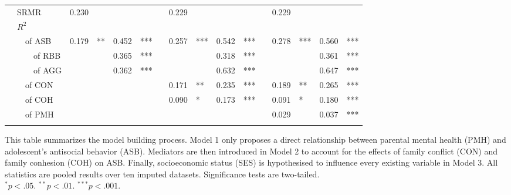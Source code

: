 {\begin{tabular}{llll r@{\hskip -0.1mm}l r@{\hskip -0.1mm}l c r@{\hskip -0.1mm}l r@{\hskip -0.1mm}l c r@{\hskip -0.1mm}l r@{\hskip -0.1mm}l}
            & \multicolumn{3}{l}{SRMR} & 0.230 &       &       &       &       & 0.229 &       &       &       &       & 0.229 &       &       &  \\
            & \multicolumn{3}{l}{$R^2$} &       &       &       &       &       &       &       &       &       &       &       &       &       &  \\
            &       & \multicolumn{2}{l}{of ASB} & 0.179 & ** & 0.452 & *** &       & 0.257 & *** & 0.542 &*** &       & 0.278 & *** & 0.560 & *** \\
            &       &       & of RBB &       &       & 0.365 & *** &       &       &       & 0.318 & *** &       &       &       & 0.361 & *** \\
            &       &       & of AGG &       &       & 0.362 & *** &       &       &       & 0.632 & *** &       &       &       & 0.647 & *** \\
            &       & \multicolumn{2}{l}{of CON} &       &       &       &       &       & 0.171 & ** & 0.235 & *** &       & 0.189 & ** & 0.265 & *** \\
            &       & \multicolumn{2}{l}{of COH} &       &       &       &       &       & 0.090 & * & 0.173 & *** &       & 0.091 & * & 0.180 & *** \\
            &       & \multicolumn{2}{l}{of PMH} &       &       &       &       &       &       &       &       &       &       & 0.029 &       & 0.037 & *** \\
            & & \multicolumn{2}{l}{\phantom{of parental mental health (PHM)}} & \phantom{$-$10,110.014} & \phantom{***} & \phantom{$-$0.065} & \phantom{***} & & \phantom{$-$10,068.675} & \phantom{***} & \phantom{$-$0.418} & \phantom{***} & & \phantom{$-$10,329.913} & \phantom{***} & \phantom{$-$0.413} & \phantom{***}\\
      \bottomrule
      \end{tabular}
}{This table summarizes the model building process. Model 1 only proposes a direct relationship between parental mental health (PMH) and adolescent's antisocial behavior (ASB). Mediators are then introduced in Model 2 to account for the effects of family conflict (CON) and family conhesion (COH) on ASB. Finally, socioeconomic status (SES) is hypothesised to influence every existing variable in Model 3. All statistics are pooled results over ten imputed datasets. Significance tests are two-tailed.\\
$^* p < .05$. $^{**} p < .01$. $^{***} p < .001$.}
